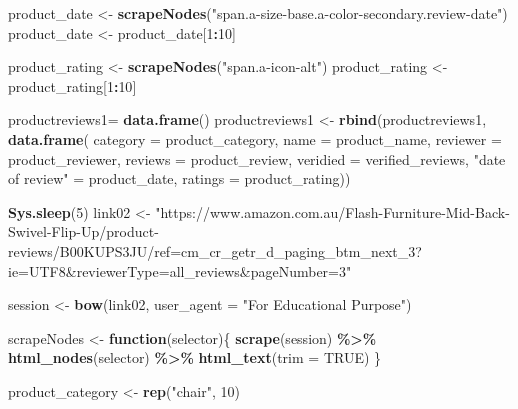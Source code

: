 \documentclass[
]{article}
\newenvironment{Shaded}{\begin{snugshade}}{\end{snugshade}}
\newcommand{\AttributeTok}[1]{\textcolor[rgb]{0.13,0.29,0.53}{#1}}
\newcommand{\ConstantTok}[1]{\textcolor[rgb]{0.56,0.35,0.01}{#1}}
\newcommand{\ControlFlowTok}[1]{\textcolor[rgb]{0.13,0.29,0.53}{\textbf{#1}}}
\newcommand{\DecValTok}[1]{\textcolor[rgb]{0.00,0.00,0.81}{#1}}
\newcommand{\FunctionTok}[1]{\textcolor[rgb]{0.13,0.29,0.53}{\textbf{#1}}}
\newcommand{\NormalTok}[1]{#1}
\newcommand{\OtherTok}[1]{\textcolor[rgb]{0.56,0.35,0.01}{#1}}
\newcommand{\SpecialCharTok}[1]{\textcolor[rgb]{0.81,0.36,0.00}{\textbf{#1}}}
\newcommand{\StringTok}[1]{\textcolor[rgb]{0.31,0.60,0.02}{#1}}
\begin{document}
\begin{Shaded}
\begin{Highlighting}[]
\NormalTok{  product\_date }\OtherTok{\textless{}{-}} \FunctionTok{scrapeNodes}\NormalTok{(}\StringTok{"span.a{-}size{-}base.a{-}color{-}secondary.review{-}date"}\NormalTok{)}
\NormalTok{  product\_date }\OtherTok{\textless{}{-}}\NormalTok{ product\_date[}\DecValTok{1}\SpecialCharTok{:}\DecValTok{10}\NormalTok{]}
  
\NormalTok{  product\_rating }\OtherTok{\textless{}{-}} \FunctionTok{scrapeNodes}\NormalTok{(}\StringTok{"span.a{-}icon{-}alt"}\NormalTok{)}
\NormalTok{  product\_rating }\OtherTok{\textless{}{-}}\NormalTok{ product\_rating[}\DecValTok{1}\SpecialCharTok{:}\DecValTok{10}\NormalTok{]}
  
\NormalTok{  productreviews1}\OtherTok{=} \FunctionTok{data.frame}\NormalTok{()}
\NormalTok{  productreviews1 }\OtherTok{\textless{}{-}} \FunctionTok{rbind}\NormalTok{(productreviews1, }\FunctionTok{data.frame}\NormalTok{(}
                      \AttributeTok{category =}\NormalTok{ product\_category,}
                      \AttributeTok{name =}\NormalTok{ product\_name,}
                      \AttributeTok{reviewer =}\NormalTok{ product\_reviewer,}
                      \AttributeTok{reviews =}\NormalTok{ product\_review,}
                      \AttributeTok{veridied =}\NormalTok{ verified\_reviews,}
                      \StringTok{"date of review"} \OtherTok{=}\NormalTok{ product\_date,}
                      \AttributeTok{ratings =}\NormalTok{ product\_rating))}

  
 \FunctionTok{Sys.sleep}\NormalTok{(}\DecValTok{5}\NormalTok{)}
\NormalTok{link02 }\OtherTok{\textless{}{-}} \StringTok{"https://www.amazon.com.au/Flash{-}Furniture{-}Mid{-}Back{-}Swivel{-}Flip{-}Up/product{-}reviews/B00KUPS3JU/ref=cm\_cr\_getr\_d\_paging\_btm\_next\_3?ie=UTF8\&reviewerType=all\_reviews\&pageNumber=3"}


\NormalTok{  session }\OtherTok{\textless{}{-}} \FunctionTok{bow}\NormalTok{(link02,}
               \AttributeTok{user\_agent =} \StringTok{"For Educational Purpose"}\NormalTok{)}

\NormalTok{  scrapeNodes }\OtherTok{\textless{}{-}} \ControlFlowTok{function}\NormalTok{(selector)\{}
    \FunctionTok{scrape}\NormalTok{(session) }\SpecialCharTok{\%\textgreater{}\%}
      \FunctionTok{html\_nodes}\NormalTok{(selector) }\SpecialCharTok{\%\textgreater{}\%}
      \FunctionTok{html\_text}\NormalTok{(}\AttributeTok{trim =} \ConstantTok{TRUE}\NormalTok{)}
\NormalTok{  \}}

\NormalTok{  product\_category }\OtherTok{\textless{}{-}} \FunctionTok{rep}\NormalTok{(}\StringTok{"chair"}\NormalTok{, }\DecValTok{10}\NormalTok{)}


\end{Highlighting}
\end{Shaded}
\end{document}
